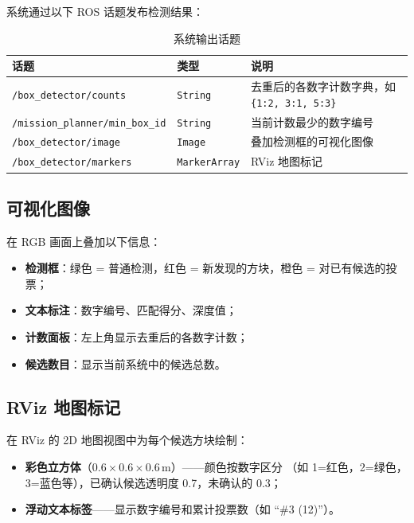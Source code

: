 \documentclass[12pt,a4paper]{article}
\begin{document}
系统通过以下 ROS 话题发布检测结果：

\begin{table}[H]
\centering
\caption{系统输出话题}
\label{tab:output_topics}
\begin{tabular}{@{}llp{7cm}@{}}
\toprule
\textbf{话题} & \textbf{类型} & \textbf{说明} \\
\midrule
\texttt{/box\_detector/counts} & \texttt{String} & 去重后的各数字计数字典，如 \texttt{\{1:2, 3:1, 5:3\}} \\
\texttt{/mission\_planner/min\_box\_id} & \texttt{String} & 当前计数最少的数字编号 \\
\texttt{/box\_detector/image} & \texttt{Image} & 叠加检测框的可视化图像 \\
\texttt{/box\_detector/markers} & \texttt{MarkerArray} & RViz 地图标记 \\
\bottomrule
\end{tabular}
\end{table}

\subsection{可视化图像}

在 RGB 画面上叠加以下信息：

\begin{itemize}
  \item \textbf{检测框}：绿色 = 普通检测，红色 = 新发现的方块，橙色 = 对已有候选的投票；
  \item \textbf{文本标注}：数字编号、匹配得分、深度值；
  \item \textbf{计数面板}：左上角显示去重后的各数字计数；
  \item \textbf{候选数目}：显示当前系统中的候选总数。
\end{itemize}

\subsection{RViz 地图标记}

在 RViz 的 2D 地图视图中为每个候选方块绘制：

\begin{itemize}
  \item \textbf{彩色立方体}（$0.6 \times 0.6 \times 0.6$\,m）——颜色按数字区分
        （如 1=红色，2=绿色，3=蓝色等），已确认候选透明度 0.7，未确认的 0.3；
  \item \textbf{浮动文本标签}——显示数字编号和累计投票数（如 ``\#3 (12)''）。
\end{itemize}
\end{document}
